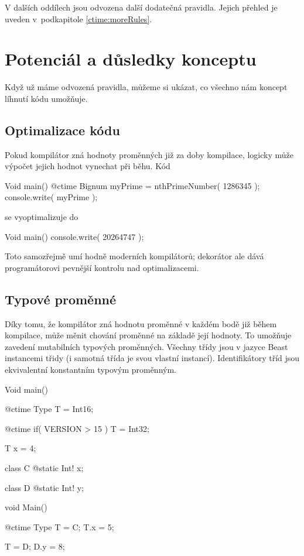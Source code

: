 V dalších oddílech jsou odvozena další dodatečná pravidla. Jejich přehled je uveden v~podkapitole \ref{ctime:moreRules}.

\section{Potenciál a důsledky konceptu}
Když už máme odvozená pravidla, můžeme si ukázat, co všechno nám koncept líhnutí kódu umožňuje.

\subsection{Optimalizace kódu}
Pokud kompilátor zná hodnoty \ctime proměnných již za doby kompilace, logicky může výpočet jejich hodnot vynechat při běhu. Kód

\begin{code}
Void main() {
	@ctime Bignum myPrime = nthPrimeNumber( 1286345 );
	console.write( myPrime );
}
\end{code}

se vyoptimalizuje do

\begin{code}
Void main() {
	console.write( 20264747 );
}
\end{code}

Toto samozřejmě umí hodně moderních kompilátorů; dekorátor  ale dává programátorovi pevnější kontrolu nad optimalizacemi.

\subsection{Typové proměnné} \label{ctime:typeVars}
Díky tomu, že kompilátor zná hodnotu \ctime proměnné v každém bodě již během kompilace, může měnit chování \ctime proměnné na základě její hodnoty. To umožňuje zavedení mutabilních typových proměnných. Všechny třídy jsou v jazyce Beast instancemi třidy  (i samotná třída  je svou vlastní instancí). Identifikátory tříd jsou ekvivalentní konstantním typovým proměnným.

\begin{code}
Void main() {
	@ctime Type T = Int16;
	
	@ctime if( VERSION > 15 )
		T = Int32;
		
	T x = 4;
}
\end{code}

\begin{code}
class C {
	@static Int! x;
}

class D {
	@static Int! y;
}

void Main() {
	@ctime Type T = C;
	T.x = 5;
	
	T = D;
	D.y = 8;
}
\end{code}


